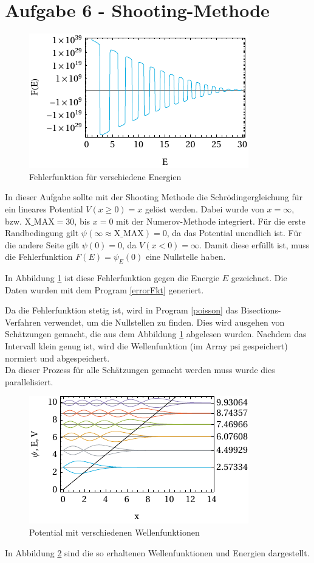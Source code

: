\section{Aufgabe 6 - Shooting-Methode}
\begin{figure}[h!]
	\centering
	\includegraphics[scale = 1.388888888]{img/errorFunction.pdf}
	\caption{Fehlerfunktion für verschiedene Energien}
	\label{fig:shooting}
\end{figure}
In dieser Aufgabe sollte mit der Shooting Methode die Schrödingergleichung für ein lineares Potential $V(x\geq 0)=x$ gelöst werden. 
Dabei wurde von $x=\infty$, bzw. $\text{X\_MAX}=30$, bis $x=0$ mit der Numerov-Methode integriert.
Für die erste Randbedingung gilt $\psi(\infty\approx\text{X\_MAX})=0$, da das Potential unendlich ist.
Für die andere Seite gilt $\psi(0)=0$, da $V(x<0)=\infty$.
Damit diese erfüllt ist, muss die Fehlerfunktion $F(E) = \psi_E(0)$ eine Nullstelle haben.

In Abbildung \ref{fig:shooting} ist diese Fehlerfunktion gegen die Energie $E$ gezeichnet.
Die Daten wurden mit dem Program \ref{errorFkt} generiert.

Da die Fehlerfunktion stetig ist, wird in Program \ref{poisson} das Bisections-Verfahren verwendet, um die Nullstellen zu finden.
Dies wird ausgehen von Schätzungen gemacht, die aus dem Abbildung \ref{fig:shooting} abgelesen wurden.
Nachdem das Intervall klein genug ist, wird die Wellenfunktion (im Array $\text{psi}$ gespeichert) normiert und abgespeichert.\\
Da dieser Prozess für alle Schätzungen gemacht werden muss wurde dies parallelisiert.

\begin{figure}[h!]
	\centering
	\includegraphics[scale = 1.388888888]{img/out.pdf}
	\caption{Potential mit verschiedenen Wellenfunktionen}
	\label{fig:out}
\end{figure}
In Abbildung \ref{fig:out} sind die so erhaltenen Wellenfunktionen und Energien dargestellt.

